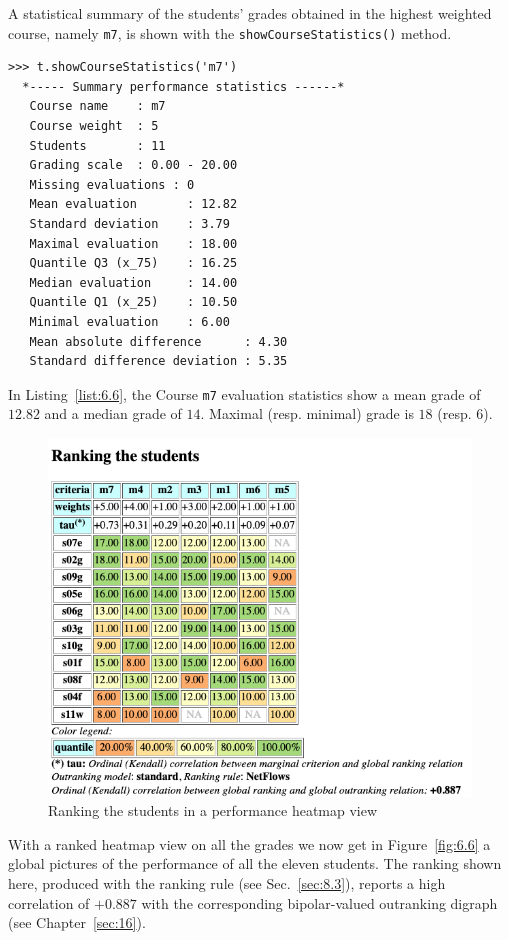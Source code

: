 A statistical summary of the students' grades obtained in the highest weighted course, namely \texttt{m7}, is shown with the \texttt{showCourseStatistics()} method. 
\begin{lstlisting}[caption={Student performance summary statistics per course},label=list:6.6]
>>> t.showCourseStatistics('m7')
  *----- Summary performance statistics ------*
   Course name    : m7
   Course weight  : 5
   Students       : 11
   Grading scale  : 0.00 - 20.00
   Missing evaluations : 0
   Mean evaluation       : 12.82
   Standard deviation    : 3.79
   Maximal evaluation    : 18.00
   Quantile Q3 (x_75)    : 16.25
   Median evaluation     : 14.00
   Quantile Q1 (x_25)    : 10.50
   Minimal evaluation    : 6.00
   Mean absolute difference      : 4.30
   Standard difference deviation : 5.35
\end{lstlisting}

In Listing~\vref{list:6.6}, the Course \texttt{m7} evaluation statistics show a mean grade of $12.82$ and a median grade of $14$. Maximal (resp. minimal) grade is $18$ (resp. $6$).

\begin{figure}[ht]
\includegraphics[width=\hsize]{Figures/6-6-rankingStudents.png}
\caption{Ranking the students in a performance heatmap view}
\label{fig:6.6}       %
\end{figure}
With a ranked heatmap view on all the grades we now get in Figure~\vref{fig:6.6} a global pictures of the performance of all the eleven students. The ranking shown here, produced with the \NetFlows ranking rule (see Sec.~\ref{sec:8.3}), reports a high correlation of $+0.887$ with the corresponding bipolar-valued outranking digraph (see Chapter~\ref{sec:16}).

